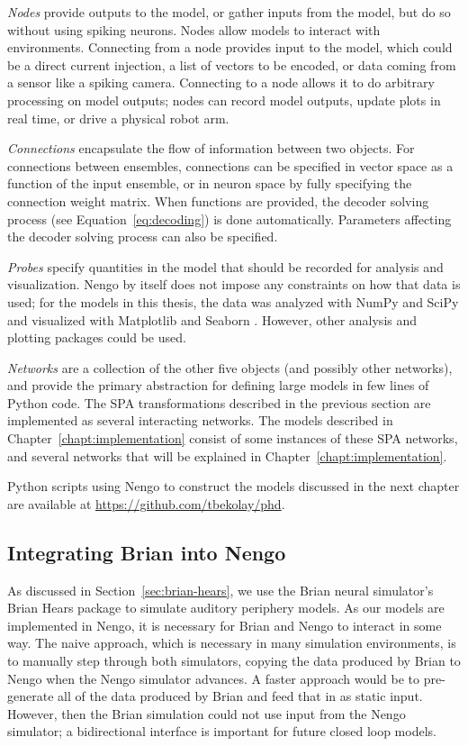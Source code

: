 \textit{Nodes} provide outputs
to the model, or gather inputs from the model,
but do so without using spiking neurons.
Nodes allow models to interact with environments.
Connecting from a node provides input
to the model, which could be
a direct current injection,
a list of vectors to be encoded,
or data coming from a sensor
like a spiking camera.
Connecting to a node allows it
to do arbitrary processing on
model outputs;
nodes can record model outputs,
update plots in real time,
or drive a physical robot arm.

\textit{Connections} encapsulate
the flow of information between two objects.
For connections between ensembles,
connections can be specified in vector space
as a function of the input ensemble,
or in neuron space
by fully specifying the connection weight matrix.
When functions are provided,
the decoder solving process
(see Equation~\eqref{eq:decoding})
is done automatically.
Parameters affecting
the decoder solving process
can also be specified.

\textit{Probes} specify quantities
in the model that should be recorded
for analysis and visualization.
Nengo by itself does not
impose any constraints on how
that data is used;
for the models in this thesis,
the data was analyzed with
NumPy \citep{vanderwalt2011}
and SciPy \citep{jones2015}
and visualized with
Matplotlib \citep{hunter2007}
and Seaborn \citep{waskom2014}.
However, other analysis and plotting packages
could be used.

\textit{Networks} are a collection of
the other five objects
(and possibly other networks),
and provide the primary abstraction
for defining large models
in few lines of Python code.
The SPA transformations
described in the previous section
are implemented as several
interacting networks.
The models described
in Chapter~\ref{chapt:implementation} consist
of some instances of
these SPA networks,
and several networks
that will be explained
in Chapter~\ref{chapt:implementation}.

Python scripts using Nengo to construct
the models discussed in the next chapter
are available at \url{https://github.com/tbekolay/phd}.

\subsection{Integrating Brian into Nengo}

As discussed in Section~\ref{sec:brian-hears},
we use the Brian neural simulator's
Brian Hears package
to simulate auditory periphery models.
As our models are implemented in Nengo,
it is necessary for Brian and Nengo
to interact in some way.
The naive approach,
which is necessary in many simulation environments,
is to manually step through both simulators,
copying the data produced by Brian
to Nengo when the Nengo simulator advances.
A faster approach would be to
pre-generate all of the data
produced by Brian
and feed that in as
static input.
However,
then the Brian simulation could not
use input from the Nengo simulator;
a bidirectional interface
is important for future closed loop models.

